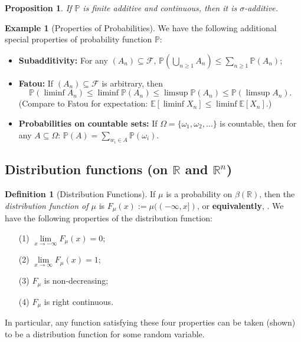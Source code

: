 \documentclass[12pt,reqno]{article}
\renewcommand{\emph}[1]{\textit{#1}}
\theoremstyle{plain}
\newtheorem{prop}[theorem]{Proposition}
\theoremstyle{definition}
\newtheorem{definition}[theorem]{Definition}
\newtheorem{example}[theorem]{Example}
\begin{document}
\begin{prop}
If $\mathbb{P}$ is finite additive and continuous, then it is 
$\sigma$-additive. 
\end{prop} 

\begin{example}[Properties of Probabilities]
We have the following additional special properties of probability 
function $\mathbb{P}$:
\begin{itemize} 

\item \textbf{Subadditivity:} For any $(A_n) \subseteq \mathcal{F}$, 
     $\mathbb{P}\left(\bigcup_{n \geq 1} A_n\right) \leq 
     \sum_{n \geq 1} \mathbb{P}(A_n)$; 
\item \textbf{Fatou:} If $(A_n) \subseteq \mathcal{F}$ is arbitrary, then 
\[
\mathbb{P}(\liminf A_n) \leq \liminf \mathbb{P}(A_n) \leq 
     \limsup \mathbb{P}(A_n) \leq \mathbb{P}(\limsup A_n). 
\]
(Compare to Fatou for expectation: $\mathbb{E}[\liminf X_n] \leq \liminf \mathbb{E}[X_n]$.)
\item \textbf{Probabilities on countable sets:} If 
     $\Omega = \{\omega_1, \omega_2, \ldots\}$ is countable, then for any 
     $A \subseteq \Omega$: $\mathbb{P}(A) = \sum_{w_i \in A} 
     \mathbb{P}(\omega_i)$. 

\end{itemize} 
\end{example} 

\subsection{Distribution functions (on $\mathbb{R}$ and $\mathbb{R}^n$)} 

\begin{definition}[Distribution Functions]
If $\mu$ is a probability on $\beta(\mathbb{R})$, then the 
\emph{distribution function of $\mu$} is 
$F_{\mu}(x) := \mu((-\infty,x])$, or \textbf{equivalently}, 
. 
We have the following properties of the 
distribution function:
\begin{itemize} 

\item[(1)] $\lim\limits_{x \rightarrow -\infty} F_{\mu}(x) = 0$; 
\item[(2)] $\lim\limits_{x \rightarrow \infty} F_{\mu}(x) = 1$; 
\item[(3)] $F_{\mu}$ is non-decreasing; 
\item[(4)] $F_{\mu}$ is right continuous. 

\end{itemize} 
In particular, any function satisfying these four properties can be taken (shown) to be a 
distribution function for some random variable.
\end{definition}
\end{document}
